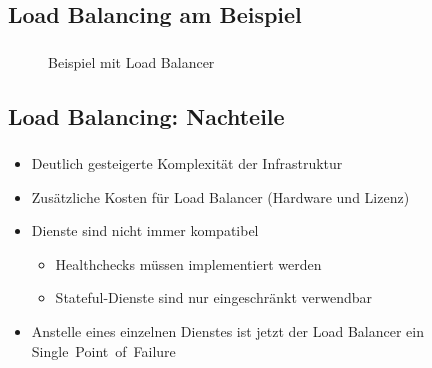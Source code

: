 \subsection{Load Balancing am Beispiel}
\begin{frame}
    \frametitle{\insertsection}
    \framesubtitle{\insertsubsection}

    \vspace*{-22pt}
    \begin{figure}[h]
        \centering
		\resizebox{!}{.75\textheight}{%
			
		}
		\captionsetup{aboveskip=2pt}
        \caption{Beispiel mit Load Balancer}
    \end{figure}
\end{frame}

\subsection{Load Balancing: Nachteile}
\begin{frame}
    \frametitle{\insertsection}
    \framesubtitle{\insertsubsection}
    
    \begin{itemize}
    	\item Deutlich gesteigerte Komplexität der Infrastruktur
    	\item Zusätzliche Kosten für Load Balancer (Hardware und Lizenz)%
    	\item Dienste sind nicht immer kompatibel
		\begin{itemize}
			\item Healthchecks müssen implementiert werden
			\item Stateful-Dienste sind nur eingeschränkt verwendbar
		\end{itemize}
    	\item Anstelle eines einzelnen Dienstes ist jetzt der Load Balancer ein Single~Point~of~Failure
    \end{itemize}
\end{frame}

